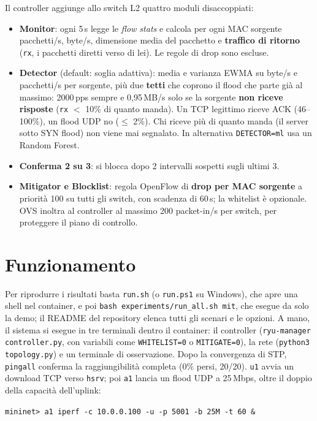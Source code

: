 \documentclass[11pt,a4paper]{article}
\newcommand{\code}[1]{\texttt{#1}}
\begin{document}
Il controller aggiunge allo switch L2 quattro moduli disaccoppiati:
\begin{itemize}
  \item \textbf{Monitor}: ogni 5\,s legge le \emph{flow stats} e calcola per ogni MAC sorgente
        pacchetti/s, byte/s, dimensione media del pacchetto e \textbf{traffico di ritorno}
        (\code{rx}, i pacchetti diretti verso di lei). Le regole di drop sono escluse.
  \item \textbf{Detector} (default: soglia adattiva): media e varianza EWMA su byte/s e pacchetti/s
        per sorgente, pi\`u due \textbf{tetti} che coprono il flood che parte gi\`a al massimo:
        2000\,pps sempre e 0,95\,MB/s solo se la sorgente \textbf{non riceve risposte}
        (\code{rx} $<$ 10\% di quanto manda). Un TCP legittimo riceve ACK (46--100\%), un flood UDP
        no ($\le$ 2\%). Chi riceve pi\`u di quanto manda (il server sotto SYN flood) non viene mai
        segnalato. In alternativa \code{DETECTOR=ml} usa un Random Forest.
  \item \textbf{Conferma 2 su 3}: si blocca dopo 2 intervalli sospetti sugli ultimi 3.
  \item \textbf{Mitigator e Blocklist}: regola OpenFlow di \textbf{drop per MAC sorgente} a
        priorit\`a 100 su tutti gli switch, con scadenza di 60\,s; la whitelist \`e opzionale.
        OVS inoltra al controller al massimo 200 packet-in/s per switch, per proteggere il piano di
        controllo.
\end{itemize}

\section{Funzionamento}
\begin{sloppypar}
Per riprodurre i risultati basta \code{run.sh} (o \code{run.ps1} su Windows), che apre una shell nel
container, e poi \code{bash experiments/run\_all.sh mit}, che esegue da solo la demo; il README del
repository elenca tutti gli scenari e le opzioni. A mano, il sistema si esegue in tre terminali
dentro il container: il controller
(\code{ryu-manager controller.py}, con variabili come \code{WHITELIST=0} o \code{MITIGATE=0}), la
rete (\code{python3 topology.py}) e un terminale di osservazione. Dopo la convergenza di STP,
\code{pingall} conferma la raggiungibilit\`a completa (0\% persi, 20/20). \code{u1} avvia un
download TCP verso \code{hsrv}; poi \code{a1} lancia un flood UDP a 25\,Mbps, oltre il doppio della
capacit\`a dell'uplink:
\end{sloppypar}
\vspace{-2pt}
\begin{center}\small\code{mininet> a1 iperf -c 10.0.0.100 -u -p 5001 -b 25M -t 60 \&}\end{center}
\vspace{-4pt}
\end{document}
